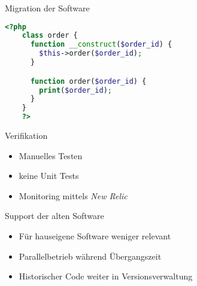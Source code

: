 \begin{frame}[fragile] {Migration der Software}
    \begin{lstlisting}[language=php]
    <?php
    class order {
      function __construct($order_id) {
        $this->order($order_id);
      }

      function order($order_id) {
        print($order_id);
      }
    }
    ?>
    \end{lstlisting}
\end{frame}

\begin{frame}{Verifikation}
    \begin{itemize}
        \item Manuelles Testen
        \item keine Unit Tests
        \item Monitoring mittels \emph{New Relic}
    \end{itemize}
\end{frame}

\begin{frame}{Support der alten Software}
    \begin{itemize}
        \item Für hauseigene Software weniger relevant
        \item Parallelbetrieb während Übergangszeit
        \item Historischer Code weiter in Versionsverwaltung
    \end{itemize}
\end{frame}